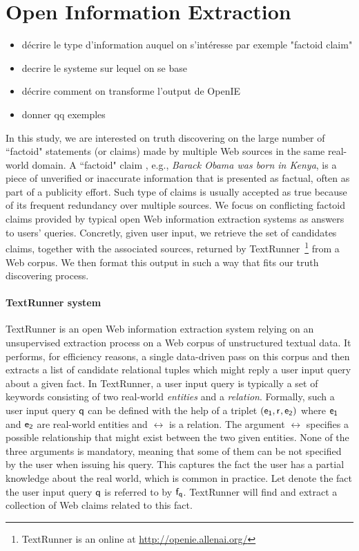 \section{Open Information Extraction}
\begin{itemize}
 \item décrire le type d'information auquel on s'intéresse par exemple "factoid claim"
 \item decrire le systeme sur lequel on se base
 \item décrire comment on transforme l'output de OpenIE
 \item donner qq exemples
\end{itemize}


In this study, we are interested on truth discovering on the large number of ``factoid" statements
(or claims) made by multiple Web sources in the same real-world domain. A ``factoid" claim , e.g., 
\emph{Barack Obama was born in Kenya}, is
a piece of unverified or inaccurate information that is presented as factual, often
as part of a publicity effort. Such type of claims  is usually accepted as true  because of its
frequent redundancy over multiple sources. We focus on conflicting factoid claims provided by typical 
open Web information extraction systems as answers to users' queries. Concretly, given user input, 
we retrieve the set of candidates claims, together with the associated sources, returned by TextRunner~\footnote{TextRunner is an online
at \href{http://openie.allenai.org/}{http://openie.allenai.org/}}
from a Web corpus. We then format this output in such a way that fits our truth discovering process.



\paragraph*{TextRunner system}
TextRunner is an open Web information extraction system 
relying on an unsupervised extraction process on a Web corpus 
of unstructured textual data. It performs, for efficiency reasons,
a single data-driven pass on this corpus and then extracts a list of
candidate relational tuples which might reply a user input query about 
a given fact. In TextRunner, a user input query is typically a set of keywords
consisting  of two real-world \emph{entities} and a \emph{relation}. Formally, 
such a user input query $\mathsf{q}$ can be defined with the help of a triplet $(\mathsf{e_{1}}, \mathsf{r}_{}, \mathsf{e_{2}})$
where $\mathsf{e_{1}}$ and $\mathsf{e_{2}}$ are real-world entities and $\rel{}$ is a relation. The argument $\rel{}$ 
specifies a possible relationship that might exist between the two given entities. None of the three 
arguments is mandatory, meaning that some of them can be not specified by the user when issuing 
his query. This captures the fact the user has a partial knowledge about the real world, which is 
common in practice. Let denote the fact the user input query $\mathsf{q}$ is referred to by $\mathsf{f}_{\mathsf{q}}$. 
TextRunner will find and extract a collection of Web claims related to this fact.

